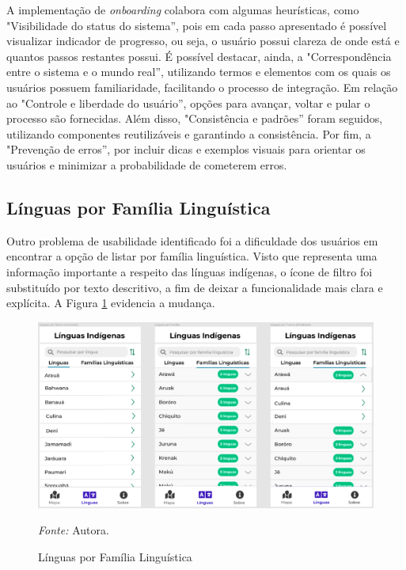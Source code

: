 A implementação de \textit{onboarding} colabora com algumas heurísticas, como "Visibilidade do status do sistema'', pois em cada passo apresentado é possível visualizar indicador de progresso, ou seja, 
o usuário possui clareza de onde está e quantos passos restantes possui. É possível destacar, ainda, a "Correspondência entre o sistema e o mundo real'', utilizando termos e elementos com os quais os usuários 
possuem familiaridade, facilitando o processo de integração. Em relação ao "Controle e liberdade do usuário'', opções para avançar, voltar e pular o processo são fornecidas. Além disso, "Consistência e 
padrões'' foram seguidos, utilizando componentes reutilizáveis e garantindo a consistência. Por fim, a "Prevenção de erros'', por incluir dicas e exemplos visuais para orientar os usuários e  minimizar 
a probabilidade de cometerem erros.

\subsection{Línguas por Família Linguística}
\label{sec:Familia Linguistica}
Outro problema de usabilidade identificado foi a dificuldade dos usuários em encontrar a opção de listar por família linguística. Visto que representa uma informação importante a respeito das línguas indígenas, 
o ícone de filtro foi substituído por texto descritivo, a fim de deixar a funcionalidade mais clara e  explícita. A Figura \ref{fig24} evidencia a mudança.

\begin{figure}[h!]
	\centering
	\caption{Línguas por Família Linguística}
	\begin{adjustbox}{center}
		\includegraphics[width=1\textwidth]{figuras/linguas.eps}
	\end{adjustbox}
		\begin{tablenotes}[flushleft]
		\centering
		\item \textit{Fonte:} Autora.
	\end{tablenotes}
	\label{fig24}
\end{figure}


